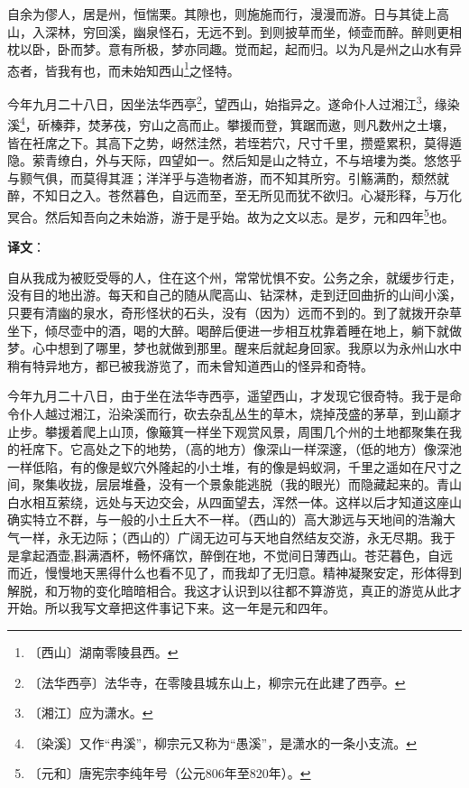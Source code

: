 \documentclass[12pt,UTF-8,openany]{ctexbook}
\begin{document}
\begin{normalsize}
    
    自余为僇人，居是州，恒惴栗。其隙也，则施施而行，漫漫而游。日与其徒上高山，入深林，穷回溪，幽泉怪石，无远不到。到则披草而坐，倾壶而醉。醉则更相枕以卧，卧而梦。意有所极，梦亦同趣。觉而起，起而归。以为凡是州之山水有异态者，皆我有也，而未始知西山\footnote{〔西山〕湖南零陵县西。}之怪特。
    
    今年九月二十八日，因坐法华西亭\footnote{〔法华西亭〕法华寺，在零陵县城东山上，柳宗元在此建了西亭。}，望西山，始指异之。遂命仆人过湘江\footnote{〔湘江〕应为潇水。}，缘染溪\footnote{〔染溪〕又作“冉溪”，柳宗元又称为“愚溪”，是潇水的一条小支流。}，斫榛莽，焚茅茷，穷山之高而止。攀援而登，箕踞而遨，则凡数州之土壤，皆在衽席之下。其高下之势，岈然洼然，若垤若穴，尺寸千里，攒蹙累积，莫得遁隐。萦青缭白，外与天际，四望如一。然后知是山之特立，不与培塿为类。悠悠乎与颢气俱，而莫得其涯；洋洋乎与造物者游，而不知其所穷。引觞满酌，颓然就醉，不知日之入。苍然暮色，自远而至，至无所见而犹不欲归。心凝形释，与万化冥合。然后知吾向之未始游，游于是乎始。故为之文以志。是岁，元和四年\footnote{〔元和〕唐宪宗李纯年号（公元806年至820年）。}也。
\end{normalsize}


\newpage

\textbf{译文}：

\vspace{1em}

\begin{normalsize}
    
    自从我成为被贬受辱的人，住在这个州，常常忧惧不安。公务之余，就缓步行走，没有目的地出游。每天和自己的随从爬高山、钻深林，走到迂回曲折的山间小溪，只要有清幽的泉水，奇形怪状的石头，没有（因为）远而不到的。到了就拨开杂草坐下，倾尽壶中的酒，喝的大醉。喝醉后便进一步相互枕靠着睡在地上，躺下就做梦。心中想到了哪里，梦也就做到那里。醒来后就起身回家。我原以为永州山水中稍有特异地方，都已被我游览了，而未曾知道西山的怪异和奇特。
    
    今年九月二十八日，由于坐在法华寺西亭，遥望西山，才发现它很奇特。我于是命令仆人越过湘江，沿染溪而行，砍去杂乱丛生的草木，烧掉茂盛的茅草，到山巅才止步。攀援着爬上山顶，像簸箕一样坐下观赏风景，周围几个州的土地都聚集在我的衽席下。它高处之下的地势，（高的地方）像深山一样深邃，（低的地方）像深池一样低陷，有的像是蚁穴外隆起的小土堆，有的像是蚂蚁洞，千里之遥如在尺寸之间，聚集收拢，层层堆叠，没有一个景象能逃脱（我的眼光）而隐藏起来的。青山白水相互萦绕，远处与天边交会，从四面望去，浑然一体。这样以后才知道这座山确实特立不群，与一般的小土丘大不一样。（西山的）高大渺远与天地间的浩瀚大气一样，永无边际；（西山的）广阔无边可与天地自然结友交游，永无尽期。我于是拿起酒壶,斟满酒杯，畅怀痛饮，醉倒在地，不觉间日薄西山。苍茫暮色，自远而近，慢慢地天黑得什么也看不见了，而我却了无归意。精神凝聚安定，形体得到解脱，和万物的变化暗暗相合。我这才认识到以往都不算游览，真正的游览从此才开始。所以我写文章把这件事记下来。这一年是元和四年。
    
\end{normalsize}
\end{document}
